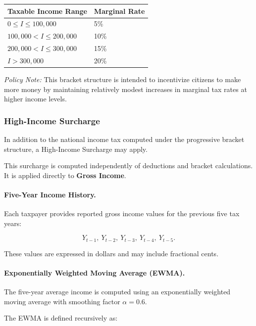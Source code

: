 \begin{center}
\begin{tabular}{l l}
\toprule
\textbf{Taxable Income Range} & \textbf{Marginal Rate} \\
\midrule
$0 \leq I \leq 100{,}000$ & 5\% \\
$100{,}000 < I \leq 200{,}000$ & 10\% \\
$200{,}000 < I \leq 300{,}000$ & 15\% \\
$I > 300{,}000$ & 20\% \\
\bottomrule
\end{tabular}
\end{center}

\medskip

\textit{Policy Note:}  
This bracket structure is intended to incentivize citizens to make more money by maintaining relatively modest increases in marginal tax rates at higher income levels.

\subsubsection{High-Income Surcharge}

In addition to the national income tax computed under the progressive bracket structure, a High-Income Surcharge may apply.

This surcharge is computed independently of deductions and bracket calculations.
It is applied directly to \textbf{Gross Income}.

\paragraph{Five-Year Income History.}

Each taxpayer provides reported gross income values for the previous five tax years:

\[
Y_{t-1},\ Y_{t-2},\ Y_{t-3},\ Y_{t-4},\ Y_{t-5}.
\]

These values are expressed in dollars and may include fractional cents.

\paragraph{Exponentially Weighted Moving Average (EWMA).}

The five-year average income is computed using an exponentially weighted moving average with smoothing factor $\alpha = 0.6$.

The EWMA is defined recursively as:


